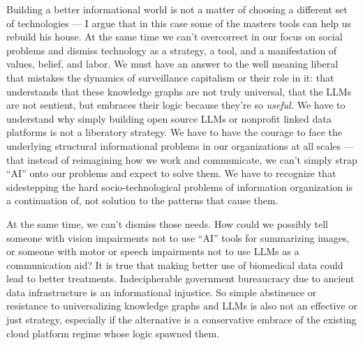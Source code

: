 Building a better informational world is not a matter of choosing a
different set of technologies --- I argue that in this case some of the
masters tools can help us rebuild his house. At the same time we can't
overcorrect in our focus on social problems and dismiss technology as a
strategy, a tool, and a manifestation of values, belief, and labor. We
must have an answer to the well meaning liberal that mistakes the
dynamics of surveillance capitalism or their role in it: that
understands that these knowledge graphs are not truly universal, that
the LLMs are not sentient, but embraces their logic because they're so
\emph{useful.} We have to understand why simply building open source
LLMs or nonprofit linked data platforms is not a liberatory strategy. We
have to have the courage to face the underlying structural informational
problems in our organizations at all scales --- that instead of
reimagining how we work and communicate, we can't simply strap ``AI''
onto our problems and expect to solve them. We have to recognize that
sidestepping the hard socio-technological problems of information
organization is a continuation of, not solution to the patterns that
cause them.

At the same time, we can't dismiss those needs. How could we possibly
tell someone with vision impairments not to use ``AI'' tools for
summarizing images, or someone with motor or speech impairments not to
use LLMs as a communication aid? It is true that making better use of
biomedical data could lead to better treatments. Indecipherable
government bureaucracy due to ancient data infrastructure is an
informational injustice. So simple abstinence or resistance to
universalizing knowledge graphs and LLMs is also not an effective or
just strategy, especially if the alternative is a conservative embrace
of the existing cloud platform regime whose logic spawned them.

